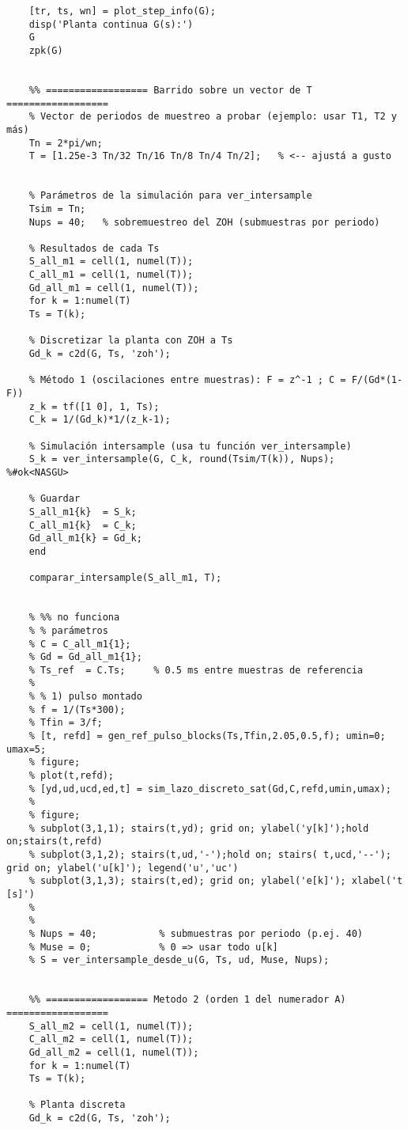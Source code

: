 {\begin{lstlisting}[style=matlabstyle,caption={Hoja de cálculos para el diseño de los compensadores.}]
	%% Analizamos en el tiempo
	[tr, ts, wn] = plot_step_info(G);
	disp('Planta continua G(s):')
	G
	zpk(G)
	
	
	%% ================== Barrido sobre un vector de T ==================
	% Vector de periodos de muestreo a probar (ejemplo: usar T1, T2 y más)
	Tn = 2*pi/wn;
	T = [1.25e-3 Tn/32 Tn/16 Tn/8 Tn/4 Tn/2];   % <-- ajustá a gusto
	
	
	% Parámetros de la simulación para ver_intersample
	Tsim = Tn; 
	Nups = 40;   % sobremuestreo del ZOH (submuestras por periodo)
	
	% Resultados de cada Ts
	S_all_m1 = cell(1, numel(T));
	C_all_m1 = cell(1, numel(T));
	Gd_all_m1 = cell(1, numel(T));
	for k = 1:numel(T)
	Ts = T(k);
	
	% Discretizar la planta con ZOH a Ts
	Gd_k = c2d(G, Ts, 'zoh');
	
	% Método 1 (oscilaciones entre muestras): F = z^-1 ; C = F/(Gd*(1-F))
	z_k = tf([1 0], 1, Ts);
	C_k = 1/(Gd_k)*1/(z_k-1);
	
	% Simulación intersample (usa tu función ver_intersample)
	S_k = ver_intersample(G, C_k, round(Tsim/T(k)), Nups);  %#ok<NASGU>
	
	% Guardar
	S_all_m1{k}  = S_k;
	C_all_m1{k}  = C_k;
	Gd_all_m1{k} = Gd_k;
	end
	
	comparar_intersample(S_all_m1, T);
	
	
	% %% no funciona
	% % parámetros
	% C = C_all_m1{1};
	% Gd = Gd_all_m1{1};
	% Ts_ref  = C.Ts;     % 0.5 ms entre muestras de referencia
	% 
	% % 1) pulso montado
	% f = 1/(Ts*300);
	% Tfin = 3/f;
	% [t, refd] = gen_ref_pulso_blocks(Ts,Tfin,2.05,0.5,f); umin=0; umax=5;
	% figure;
	% plot(t,refd);
	% [yd,ud,ucd,ed,t] = sim_lazo_discreto_sat(Gd,C,refd,umin,umax);
	% 
	% figure;
	% subplot(3,1,1); stairs(t,yd); grid on; ylabel('y[k]');hold on;stairs(t,refd)
	% subplot(3,1,2); stairs(t,ud,'-');hold on; stairs( t,ucd,'--'); grid on; ylabel('u[k]'); legend('u','uc')
	% subplot(3,1,3); stairs(t,ed); grid on; ylabel('e[k]'); xlabel('t [s]')
	% 
	% 
	% Nups = 40;           % submuestras por periodo (p.ej. 40)
	% Muse = 0;            % 0 => usar todo u[k]
	% S = ver_intersample_desde_u(G, Ts, ud, Muse, Nups);
	
	
	%% ================== Metodo 2 (orden 1 del numerador A) ==================
	S_all_m2 = cell(1, numel(T));
	C_all_m2 = cell(1, numel(T));
	Gd_all_m2 = cell(1, numel(T));
	for k = 1:numel(T)
	Ts = T(k);
	
	% Planta discreta
	Gd_k = c2d(G, Ts, 'zoh');
	

\end{lstlisting}}

